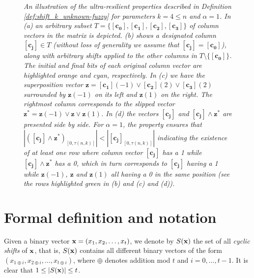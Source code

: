 \documentclass[11pt]{article}
\begin{document}
\begin{figure}[t!]
\vspace*{-2ex}
\caption{\textit{\small
An illustration of the ultra-resilient properties described in Definition 
\ref{def:shift_k_unknown-fuzzy} for parameters $k = 4 \le n$ and $\alpha = 1$. 
In (a) an arbitrary subset 
$T = \{\mathbf{[c_0]}, \mathbf{[c_1]}, \mathbf{[c_2]}, \mathbf{[c_3]} \}$ 
of column vectors in the matrix is depicted. (b) shows a designated column 
$\mathbf{[c_j]} \in T$ (without loss of generality we assume that $\mathbf{[c_j]} = \mathbf{[c_0]}$), 
along with arbitrary shifts applied to the other columns in $T \setminus \{\mathbf{[c_0]} \}$.
The initial and final bits of each original column vector are highlighted orange and cyan, 
respectively. 
In (c) we have the superposition
vector 
$\mathbf{z} = \mathbf{[c_1]}(-1) \lor \mathbf{[c_2]}(2) \lor \mathbf{[c_3]}(2)$
surrounded by $\mathbf{z}(-1)$ on its left and $\mathbf{z}(1)$ on the right.
The rightmost column corresponds to the slipped vector
$\mathbf{z^*} = \mathbf{z}(-1) \lor \mathbf{z} \lor \mathbf{z}(1)$.
In (d) the vectors $\mathbf{[c_j]}$ and $\mathbf{[c_j]} \wedge \mathbf{z^*}$ 
are presented side by side. 
For $\alpha = 1$, the property ensures that 
$\left| (\mathbf{[c_{j}]} \wedge \mathbf{z^*} )_{[0, \tau(n,k)]} \right| <  \left|\mathbf{[c_j]}_{[0,\tau(n,k)]} \right|$
indicating the existence of at least one row where column vector $\mathbf{[c_{j}]}$ has a 1 while 
$\mathbf{[c_j]} \wedge \mathbf{z^*}$ has a 0, which in turn corresponds to 
$\mathbf{[c_j]}$ having a 1 while $\mathbf{z}(-1)$,  $\mathbf{z}$ and  $\mathbf{z}(1)$ 
all having a 0 in the same position (see the rows highlighted green in (b) and (c) and (d)).
}}
\label{fig:shiftSP}	
\end{figure}



\section{Formal definition and notation}
\label{sec:preliminaries}

Given a binary vector ${\bf x} = (x_1, x_2, \ldots, x_t)$, we denote by $S({\bf x})$ 
the set of all \textit{cyclic shifts} of ${\bf x}$, that is, $S({\bf x})$ contains all 
different binary vectors of the form $(x_{1\oplus i}, x_{2\oplus i}, \ldots, x_{t\oplus i})$, 
where $\oplus$ denotes addition mod $t$ and $i=0, \ldots, t-1$. 
It is clear that $1 \leq |S({\bf x})| \leq t$.
\end{document}
